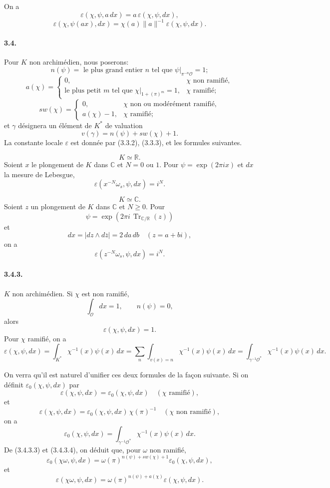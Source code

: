 \documentclass[10pt]{article}
\newcommand{\C}{\mathbb C}
\newcommand{\Tr}{\operatorname{Tr}}
\providecommand{\R}{\mathbb R}
\providecommand{\Tr}{\operatorname{Tr}}
\providecommand{\Tr}{\operatorname{Tr}}
\providecommand{\Tr}{\operatorname{Tr}}
\begin{document}
On a
\[
\tag{3.3.2}
\varepsilon(\chi,\psi,a\,dx)=a\,\varepsilon(\chi,\psi,dx),
\]
\[
\tag{3.3.3}
\varepsilon(\chi,\psi(ax),dx)=\chi(a)\|a\|^{-1}\varepsilon(\chi,\psi,dx).
\]

\paragraph{3.4.} Pour \(K\) non archimédien, nous poserons:
\[
n(\psi)=\text{ le plus grand entier }n\text{ tel que }\psi|_{\pi^{-n}\mathcal O}=1;
\]
\[
a(\chi)=
\begin{cases}
0,&\chi\text{ non ramifié},\\
\text{le plus petit }m\text{ tel que }\chi|_{1+(\pi)^m}=1,&\chi\text{ ramifié};
\end{cases}
\]
\[
sw(\chi)=
\begin{cases}
0,&\chi\text{ non ou modérément ramifié},\\
a(\chi)-1,&\chi\text{ ramifié};
\end{cases}
\]
et \(\gamma\) désignera un élément de \(K^*\) de valuation
\[
v(\gamma)=n(\psi)+sw(\chi)+1.
\]
La constante locale \(\varepsilon\) est donnée par (3.3.2), (3.3.3), et les formules suivantes.

\[
\tag{3.4.1}
K\simeq\R.
\]
Soient \(x\) le plongement de \(K\) dans \(\C\) et \(N=0\) ou \(1\). Pour \(\psi=\exp(2\pi ix)\) et \(dx\) la mesure de Lebesgue,
\[
\varepsilon(x^{-N}\omega_s,\psi,dx)=i^N.
\]

\[
\tag{3.4.2}
K\simeq\C.
\]
Soient \(z\) un plongement de \(K\) dans \(\C\) et \(N\ge0\). Pour
\[
\psi=\exp(2\pi i\,\Tr_{\C/\R}(z))
\]
et
\[
dx=|dz\wedge d\overline z|=2\,da\,db\quad(z=a+bi),
\]
on a
\[
\varepsilon(z^{-N}\omega_s,\psi,dx)=i^N.
\]

\paragraph{3.4.3.} \(K\) non archimédien. Si \(\chi\) est non ramifié,
\[
\int_{\mathcal O}dx=1,\qquad n(\psi)=0,
\]
alors
\[
\tag{3.4.3.1}
\varepsilon(\chi,\psi,dx)=1.
\]
Pour \(\chi\) ramifié, on a
\[
\tag{3.4.3.2}
\varepsilon(\chi,\psi,dx)=
\int_{K^*}\chi^{-1}(x)\psi(x)\,dx
=
\sum_n\int_{v(x)=n}\chi^{-1}(x)\psi(x)\,dx
=
\int_{\gamma^{-1}\mathcal O^*}\chi^{-1}(x)\psi(x)\,dx.
\]

On verra qu'il est naturel d'unifier ces deux formules de la façon suivante. Si on définit \(\varepsilon_0(\chi,\psi,dx)\) par
\[
\varepsilon(\chi,\psi,dx)=\varepsilon_0(\chi,\psi,dx)
\quad(\chi\text{ ramifié}),
\]
et
\[
\tag{3.4.3.3}
\varepsilon(\chi,\psi,dx)=\varepsilon_0(\chi,\psi,dx)\,\chi(\pi)^{-1}
\quad(\chi\text{ non ramifié}),
\]
on a
\[
\tag{3.4.3.4}
\varepsilon_0(\chi,\psi,dx)=
\int_{\gamma^{-1}\mathcal O^*}\chi^{-1}(x)\psi(x)\,dx.
\]
De (3.4.3.3) et (3.4.3.4), on déduit que, pour \(\omega\) non ramifié,
\[
\tag{3.4.3.5}
\varepsilon_0(\chi\omega,\psi,dx)
=
\omega(\pi)^{n(\psi)+sw(\chi)+1}\varepsilon_0(\chi,\psi,dx),
\]
et
\[
\varepsilon(\chi\omega,\psi,dx)
=
\omega(\pi)^{n(\psi)+a(\chi)}\varepsilon(\chi,\psi,dx).
\]
\end{document}

